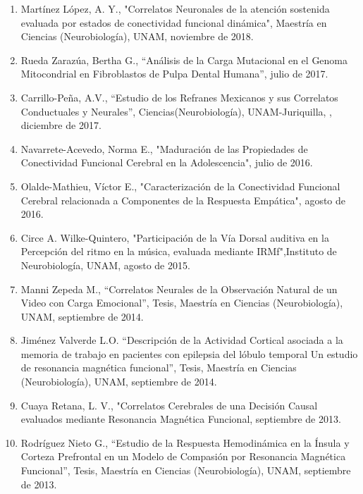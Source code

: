 \begin{enumerate}
\item Martínez López, A. Y., "Correlatos Neuronales de la atención sostenida evaluada por estados de conectividad funcional dinámica", Maestría en Ciencias 
(Neurobiología), UNAM,   noviembre de 2018.

\item Rueda Zarazúa, Bertha G., “Análisis de la Carga Mutacional en el Genoma Mitocondrial en Fibroblastos de Pulpa Dental Humana”,   julio de 2017.

\item Carrillo-Peña, A.V., “Estudio de los Refranes Mexicanos y sus Correlatos Conductuales y Neurales”, Ciencias(Neurobiología), UNAM-Juriquilla, ,   
diciembre 
de 2017.

\item Navarrete-Acevedo, Norma E., "Maduración de las Propiedades de Conectividad Funcional Cerebral en la Adolescencia",   julio de 2016.

\item Olalde-Mathieu, Víctor E., "Caracterización de la Conectividad Funcional Cerebral relacionada a Componentes de la Respuesta Empática",   agosto de 
2016.

\item Circe A. Wilke-Quintero, "Participación de la Vía Dorsal auditiva en la Percepción del ritmo en la música, evaluada mediante IRMf",Instituto de 
Neurobiología, UNAM,   agosto de 2015.

\item Manni Zepeda M., “Correlatos Neurales de la Observación Natural de un Video con Carga Emocional”, Tesis, Maestría en Ciencias (Neurobiología), UNAM,   
septiembre de 2014.

\item Jiménez Valverde L.O. “Descripción de la Actividad Cortical asociada a la memoria de trabajo en pacientes con epilepsia del lóbulo temporal Un estudio 
de 
resonancia magnética funcional”, Tesis, Maestría en Ciencias (Neurobiología), UNAM,   septiembre de 2014.

\item Cuaya Retana, L. V., "Correlatos Cerebrales de una Decisión Causal evaluados mediante Resonancia Magnética Funcional,   septiembre de 2013.

\item Rodríguez Nieto G., “Estudio de la Respuesta Hemodinámica en la Ínsula y Corteza Prefrontal en un Modelo de Compasión por Resonancia Magnética 
Funcional”, 
Tesis, Maestría en Ciencias (Neurobiología), UNAM,   septiembre de 2013.


\end{enumerate}
